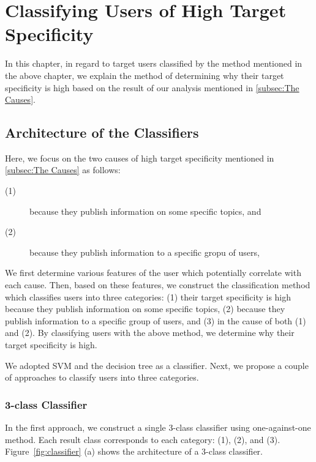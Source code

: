 \section{Classifying Users of High Target Specificity}
\label{sec:ClassificationMethod2}

In this chapter, in regard to target users classified by the method
mentioned in the above chapter, we explain the method of determining why
their target specificity is high based on the result of our analysis
mentioned in \ref{subsec:The Causes}.

\subsection{Architecture of the Classifiers}
\label{subsec:Architecture}

Here, we focus on the two causes of high target specificity
mentioned in \ref{subsec:The Causes} as follows:
\begin{description}
 \item[(1)] because they publish information on some specific topics, and
 \item[(2)] because they publish information to a specific gropu of users,
\end{description}


We first determine various features of the user which potentially
correlate with each cause.  Then, based on these features, we construct
the classification method which classifies users into three categories:
(1) their target specificity is high because they publish information
on some specific topics, (2) because they publish information to
a specific group of users, and (3) in the cause of both (1) and
(2).  By classifying users with the above method, we determine why
their target specificity is high.

We adopted SVM and the decision tree as a classifier.  Next, we propose a
couple of approaches to classify users into three categories.

\subsubsection{3-class Classifier}
\label{subsubsec:3-class}

In the first approach, we construct a single 3-class classifier using
one-against-one method.  Each result class corresponds to each category:
(1), (2), and (3).  Figure~\ref{fig:classifier} (a) shows the architecture
of a 3-class classifier.

